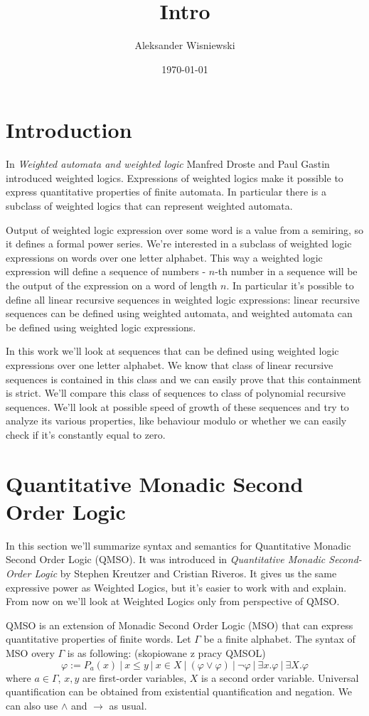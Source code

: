 \documentclass[12pt]{article}
\title{Intro}
\author{Aleksander Wisniewski}
\date{\today}
\theoremstyle{definition}
\begin{document}
\maketitle

\section{Introduction}
In \textit{Weighted automata and weighted logic} Manfred Droste and Paul Gastin introduced weighted logics. Expressions of weighted logics make it possible to express quantitative properties of finite automata. In particular there is a subclass of weighted logics that can represent weighted automata. 

Output of weighted logic expression over some word is a value from a semiring, so it defines a formal power series. We're interested in a subclass of weighted logic expressions on words over one letter alphabet. This way a weighted logic expression will define a sequence of numbers - $n$-th number in a sequence will be the output of the expression on a word of length $n$. In particular it's possible to define all linear recursive sequences in weighted logic expressions: linear recursive sequences can be defined using weighted automata, and weighted automata can be defined using weighted logic expressions.

In this work we'll look at sequences that can be defined using weighted logic expressions over one letter alphabet. We know that class of linear recursive sequences is contained in this class and we can easily prove that this containment is strict. We'll compare this class of sequences to class of polynomial recursive sequences. We'll look at possible speed of growth of these sequences and try to analyze its various properties, like behaviour modulo or whether we can easily check if it's constantly equal to zero.

\section{Quantitative Monadic Second Order Logic}
In this section we'll summarize syntax and semantics for Quantitative Monadic Second Order Logic (QMSO). It was introduced in \textit{Quantitative Monadic Second-Order Logic} by Stephen Kreutzer and Cristian Riveros. It gives us the same expressive power as Weighted Logics, but it's easier to work with and explain. From now on we'll look at Weighted Logics only from perspective of QMSO.

QMSO is an extension of Monadic Second Order Logic (MSO) that can express quantitative properties of finite words. Let $\Gamma$ be a finite alphabet. The syntax of MSO overy $\Gamma$ is as following: (skopiowane z pracy QMSOL)
$$ \varphi := P_a(x) \ | \ x \leq y \ | \ x \in X \ | \ (\varphi \lor \varphi) \ | \ \neg \varphi \ | \ \exists x. \varphi \ | \ \exists X . \varphi $$
where $a \in \Gamma$, $x, y$ are first-order variables, $X$ is a second order variable. Universal quantification can be obtained from existential quantification and negation. We can also use $\land$ and $\rightarrow$ as usual.
\end{document}
